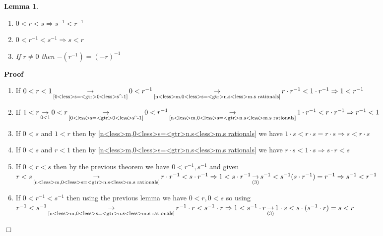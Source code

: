 \documentclass{book}
\newcommand{\Rightarrowlim}{\mathop{\rightarrow}\limits}
\newcommand{\um}{-}
\newenvironment{proof}{\noindent\textbf{Proof\ }}{\hspace*{\fill}$\Box$\medskip}
\newtheorem{lemma}{Lemma}
\begin{document}
{{\begin{lemma}
\begin{enumerate}
    \item $0 < r < s \Rightarrow s^{- 1} < r^{- 1}$
    
    \item $0 < r^{- 1} < s^{- 1} \Rightarrow s < r$
    
    \item If $r \neq 0$ then $- (r^{- 1}) = (- r)^{- 1}$
  \end{enumerate}
\end{lemma}

\begin{proof}
  
  \begin{enumerate}
    \item If $0 < r < 1
    \Rightarrowlim_{\text{\ref{0<less>s=<gtr>0<less>s^-1}}} 0 < r^{- 1}
    \Rightarrowlim_{\text{\ref{n<less>m,0<less>s=<gtr>n.s<less>m.s
    rationals}}} r \cdot r^{- 1} < 1 \cdot r^{- 1} \Rightarrow 1 < r^{- 1}$
    
    \item If $1 < r \Rightarrowlim_{0 < 1} 0 < r
    \Rightarrowlim_{\text{\ref{0<less>s=<gtr>0<less>s^-1}}} 0 < r^{- 1}
    \Rightarrowlim_{\text{\ref{n<less>m,0<less>s=<gtr>n.s<less>m.s
    rationals}}} 1 \cdot r^{- 1} < r \cdot r^{- 1} \Rightarrow r^{- 1} < 1$
    
    \item If $0 < s$ and $1 < r$ then by
    \ref{n<less>m,0<less>s=<gtr>n.s<less>m.s rationals} we have $1 \cdot s < r
    \cdot s = r \cdot s \Rightarrow s < r \cdot s$
    
    \item If $0 < s$ and $r < 1$ then by
    \ref{n<less>m,0<less>s=<gtr>n.s<less>m.s rationals} we have $r \cdot s < 1
    \cdot s \Rightarrow s \cdot r < s$
    
    \item If $0 < r < s$ then by the previous theorem we have $0 < r^{- 1},
    s^{- 1}$ and given $r < s
    \Rightarrowlim_{\text{\ref{n<less>m,0<less>s=<gtr>n.s<less>m.s
    rationals}}} r \cdot r^{- 1} < s \cdot r^{- 1} \Rightarrow 1 < s \cdot
    r^{- 1} \Rightarrowlim_{(3)} s^{- 1} < s^{- 1} (s \cdot r^{- 1}) = r^{- 1}
    \Rightarrow s^{- 1} < r^{- 1}$
    
    \item If $0 < r^{- 1} < s^{- 1}$ then using the previous lemma we have $0
    < r, 0 < s$ so using $r^{- 1} < s^{- 1}
    \Rightarrowlim_{\text{\ref{n<less>m,0<less>s=<gtr>n.s<less>m.s
    rationals}}} r^{- 1} \cdot r < s^{\um 1} \cdot r \Rightarrow 1 < s^{- 1}
    \cdot r \Rightarrowlim_{(3)} 1 \cdot s < s \cdot (s^{- 1} \cdot r) = s <
    r$
    

\end{enumerate}
\end{proof}}}
\end{document}
